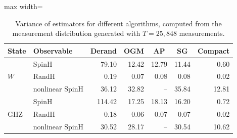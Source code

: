 \documentclass[prl,aps,notitlepage,superscriptaddress,showpacs,nofootinbib]{revtex4-2}
\newcommand{\red}[1]{{\color{red} #1}}
\begin{document}
{\begin{table}[t]
    \centering
    \caption{\red{Variance of estimators for different algorithms, computed from the measurement distribution generated with $T=25{,}848$ measurements.}}
    \label{tab:variance_maxT_experiment}
    \renewcommand{\arraystretch}{1.18}
    \setlength{\tabcolsep}{7pt}
    \begin{adjustbox}{max width=\textwidth}
    \begin{tabular}{llrrrrr}
        \toprule
        \textbf{State} & \textbf{Observable} 
        & \multicolumn{1}{c}{\textbf{Derand}} 
        & \multicolumn{1}{c}{\textbf{OGM}} 
        & \multicolumn{1}{c}{\textbf{AP}} 
        & \multicolumn{1}{c}{\textbf{SG}} 
        & \multicolumn{1}{c}{\textbf{Compact}} \\
        \midrule
        \multirow{3}{*}{$W$}
            & SpinH          & 79.10  & 12.42 & 12.79 & 11.44 & 0.60  \\
            & RandH          & 0.19   & 0.07  & 0.08  & 0.08  & 0.02  \\
            & nonlinear SpinH & 36.12  & 32.82 & --    & 35.84 & 12.81 \\
        \midrule
        \multirow{3}{*}{GHZ}
            & SpinH          & 114.42 & 17.25 & 18.13 & 16.20 & 0.72  \\
            & RandH          & 0.18   & 0.06  & 0.07  & 0.07  & 0.02  \\
            & nonlinear SpinH & 30.52  & 28.17 & --    & 30.54 & 10.62 \\
        \bottomrule
    \end{tabular}
    \end{adjustbox}
\end{table}

}

\newpage

\end{document}
